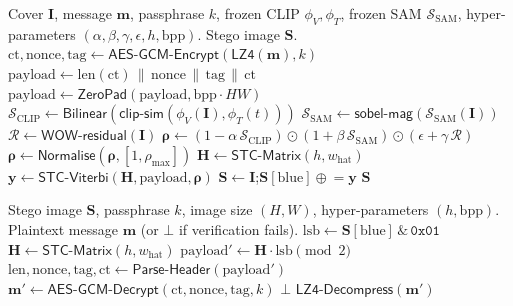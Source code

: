 \documentclass[10pt,a4paper]{article}
\newcommand{\cover}{\mathbf{I}}
\newcommand{\stego}{\mathbf{S}}
\newcommand{\cost}{\boldsymbol{\rho}}
\newcommand{\msg}{\mathbf{m}}
\newcommand{\modv}{\mathbf{y}}
\newcommand{\Hmat}{\mathbf{H}}
\newcommand{\ScC}{\mathcal{S}_{\mathrm{CLIP}}}
\newcommand{\Ss}{\mathcal{S}_{\mathrm{SAM}}}
\begin{document}
\begin{algorithm}[t]
\caption{Semantic Cloak Embedding}
\label{alg:embed}
\begin{algorithmic}[1]
\Require Cover $\cover$, message $\msg$, passphrase $k$,
         frozen CLIP $\phi_V, \phi_T$, frozen SAM $\mathcal{S}_{\text{SAM}}$,
         hyper-parameters $(\alpha, \beta, \gamma, \epsilon, h, \text{bpp})$.
\Ensure Stego image $\stego$.
\State $\text{ct}, \text{nonce}, \text{tag} \gets \textsf{AES-GCM-Encrypt}(\textsf{LZ4}(\msg), k)$
\State $\text{payload} \gets \text{len}(\text{ct}) \,\|\, \text{nonce} \,\|\, \text{tag} \,\|\, \text{ct}$
\State $\text{payload} \gets \textsf{ZeroPad}(\text{payload}, \text{bpp} \cdot HW)$
\State $\ScC \gets \textsf{Bilinear}(\textsf{clip-sim}(\phi_V(\cover), \phi_T(t)))$ 
\State $\Ss \gets \textsf{sobel-mag}(\mathcal{S}_{\text{SAM}}(\cover))$ 
\State $\mathcal{R} \gets \textsf{WOW-residual}(\cover)$
\State $\cost \gets (1 - \alpha\,\ScC) \odot (1 + \beta\,\Ss) \odot (\epsilon + \gamma\,\mathcal{R})$ 
\State $\cost \gets \textsf{Normalise}(\cost, [1, \rho_{\max}])$
\State $\Hmat \gets \textsf{STC-Matrix}(h, w_{\text{hat}})$
\State $\modv \gets \textsf{STC-Viterbi}(\Hmat, \text{payload}, \cost)$ 
\State $\stego \gets \cover$;\quad $\stego[\text{blue}] \mathrel{\oplus}= \modv$ 
\State \Return $\stego$
\end{algorithmic}
\end{algorithm}

\begin{algorithm}[t]
\caption{Semantic Cloak Extraction}
\label{alg:extract}
\begin{algorithmic}[1]
\Require Stego image $\stego$, passphrase $k$, image size $(H,W)$,
         hyper-parameters $(h, \text{bpp})$.
\Ensure Plaintext message $\msg$ (or $\bot$ if verification fails).
\State $\text{lsb} \gets \stego[\text{blue}] \,\&\, \texttt{0x01}$
\State $\Hmat \gets \textsf{STC-Matrix}(h, w_{\text{hat}})$
\State $\text{payload}' \gets \Hmat \cdot \text{lsb} \pmod 2$ 
\State $\text{len}, \text{nonce}, \text{tag}, \text{ct} \gets \textsf{Parse-Header}(\text{payload}')$
\State $\msg' \gets \textsf{AES-GCM-Decrypt}(\text{ct}, \text{nonce}, \text{tag}, k)$
\If{$\msg' = \bot$}
    \State \Return $\bot$ 
\EndIf
\State \Return $\textsf{LZ4-Decompress}(\msg')$
\end{algorithmic}
\end{algorithm}
\end{document}

